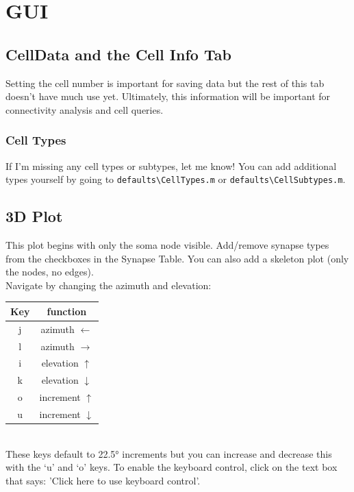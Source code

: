 \documentclass[]{exam}
\begin{document}
	\section{GUI}
		\subsection{CellData and the Cell Info Tab}
		Setting the cell number is important for saving data but the rest of this tab doesn't have much use yet. Ultimately, this information will be important for connectivity analysis and cell queries.
		\subsubsection{Cell Types}
		If I'm missing any cell types or subtypes, let me know! You can add additional types yourself by going to \verb|defaults\CellTypes.m| or \verb|defaults\CellSubtypes.m|.
		\subsection{3D Plot}
		This plot begins with only the soma node visible. Add/remove synapse types from the checkboxes in the Synapse Table. You can also add a skeleton plot (only the nodes, no edges). \\
		Navigate by changing the azimuth and elevation:\\
		\begin{tabular}{c | c}
			Key & function \\
			\hline
			j & azimuth $\longleftarrow$\\
			l & azimuth $\longrightarrow$\\
			\hline
			i & elevation $\uparrow$\\
			k & elevation $\downarrow$\\
			\hline
			o & increment $\uparrow$\\
			u & increment $\downarrow$\\
		\end{tabular}\\
		These keys default to \ang{22.5} increments but you can increase and decrease this with the `u' and `o' keys. To enable the keyboard control, click on the text box that says: 'Click here to use keyboard control'.
\end{document}
